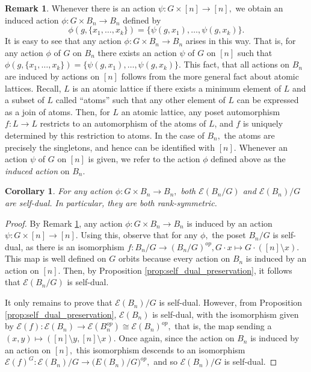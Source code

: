 \documentclass[10 pt]{amsart}
\theoremstyle{plain}
\newtheorem{cor}[thm]{Corollary}
\theoremstyle{definition}
\newtheorem{rem}[thm]{Remark}
\theoremstyle{remark}
\numberwithin{equation}{section}
\begin{document}
\begin{rem}
\label{rem:induced_action_bn}
Whenever there is an action $\psi:G \times [n] \rightarrow [n],$ we obtain an induced action $\phi: G \times B_n \rightarrow B_n$ defined by
$$\phi(g,\{x_1,\ldots, x_k\}) = \{\psi(g,x_1),\ldots, \psi(g,x_k)\}.$$
It is easy to see that any action $\phi:G \times B_n \rightarrow B_n$ arises in this way. That is, for any action $\phi$ of $G$ on $B_n$ there exists an action $\psi$ of $G$ on $[n]$ such that $\phi(g,\{x_1,\ldots, x_k\}) = \{\psi(g,x_1),\ldots, \psi(g,x_k)\}.$ This fact, that all actions on $B_n$ are induced by actions on $[n]$ follows from the more general fact about atomic lattices. Recall, $L$ is an atomic lattice if there exists a minimum element of $L$ and a subset of $L$ called ``atoms'' such that any other element of $L$ can be expressed as a join of atoms. Then, for $L$ an atomic lattice, any poset automorphism $f:L \rightarrow L$ restricts to an automorphism of the atoms of $L$, and $f$ is uniquely determined by this restriction to atoms. In the case of $B_n,$ the atoms are precisely the singletons, and hence can be identified with $[n]$.  Whenever an action $\psi$ of $G$ on $[n]$ is given, we refer to the action $\phi$ defined above as the {\it induced action} on $B_n.$
\end{rem}



\begin{cor}
\label{cor:duality_bn_quotients}
For any action $\phi:G \times B_n \rightarrow B_n,$ both $\mathcal E(B_n/G)$ and $\mathcal E(B_n)/G$ are self-dual. In particular, they are both rank-symmetric. 
\end{cor}
\begin{proof}
By Remark \ref{rem:induced_action_bn}, any action $\phi:G\times B_n \rightarrow B_n$ is induced by an action $\psi:G \times [n] \rightarrow [n].$ Using this, observe that for any $\phi,$ the poset $B_n/G$ is self-dual, as there is an isomorphism $f:B_n/G \rightarrow (B_n/G)^{op},G \cdot x \mapsto G \cdot ([n] \setminus x).$ This map is well defined on $G$ orbits because every action on $B_n$ is induced by an action on $[n].$ Then, by Proposition \ref{prop:self_dual_preservation}, it follows that $\mathcal E(B_n/G)$ is self-dual.

It only remains to prove that $\mathcal E(B_n)/G$ is self-dual. However, from Proposition \ref{prop:self_dual_preservation}, $\mathcal E(B_n)$ is self-dual, with the isomorphism given by $\mathcal E(f):\mathcal E(B_n) \rightarrow \mathcal E(B_n^{op})\cong \mathcal E(B_n)^{op},$ that is, the map sending a $(x,y) \mapsto ([n]\setminus y,[n] \setminus x).$ Once again, since the action on $B_n$ is induced by an action on $[n],$ this isomorphism descends to an isomorphism $\mathcal E(f)^G:\mathcal E(B_n)/G \rightarrow \mathcal (E(B_n)/G)^{op},$ and so $\mathcal E(B_n)/G$ is self-dual.
\end{proof}
\end{document}
